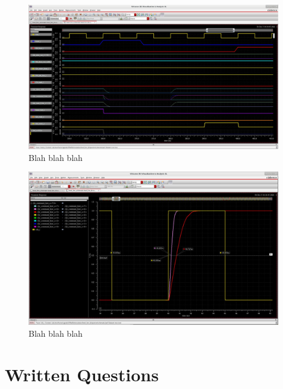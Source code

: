 \documentclass[11pt]{article}
\begin{document}
\begin{figure}[H]
    \centering
\includegraphics[width=0.99\textwidth]{fixed.png}
    \caption{Blah blah blah}
\end{figure}


\begin{figure}[H]
    \centering
\includegraphics[width=0.99\textwidth]{delay.png}
    \caption{Blah blah blah}
\end{figure}


\section{Written Questions}
\end{document}
